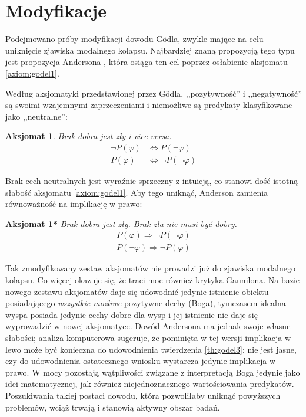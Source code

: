 \documentclass[
	runningheads
]{llncs}
\newtheorem{axiom-pl}{Aksjomat}
\begin{document}
\section{Modyfikacje} \label{sec:modyfikacje}

\setcounter{axiom-pl}{0}

Podejmowano próby modyfikacji dowodu G\"odla, zwykle mające na celu uniknięcie zjawiska modalnego kolapsu. Najbardziej znaną propozycją tego typu jest propozycja Andersona \cite{anderson1990}, która osiąga ten cel poprzez osłabienie aksjomatu \ref{axiom:godel1}. 

Według aksjomatyki przedstawionej przez G\"odla, ,,pozytywność'' i ,,negatywność'' są swoimi wzajemnymi zaprzeczeniami i niemożliwe są predykaty klasyfikowane jako ,,neutralne'':
\begin{axiom-pl}
	Brak dobra jest zły i vice versa. 
	\begin{align*}
	\neg P(\varphi) & \Leftrightarrow P(\neg \varphi) \\ 
	P(\varphi) & \Leftrightarrow \neg P( \neg \varphi )
	\end{align*}
\end{axiom-pl}
Brak cech neutralnych jest wyraźnie sprzeczny z intuicją, co stanowi dość istotną słabość aksjomatu \ref{axiom:godel1}. Aby tego uniknąć, Anderson zamienia równoważność na implikację w prawo:

\vspace*{0.2cm}
\noindent\textbf{Aksjomat 1*} \hspace*{0.1cm}
\textit{Brak dobra jest zły. Brak zła nie musi być dobry. }
\begin{align*}
	P(\varphi) \Rightarrow \neg P( \neg \varphi ) \\ 
	P( \neg \varphi ) \Rightarrow \neg P(\varphi)
\end{align*}

Tak zmodyfikowany zestaw aksjomatów nie prowadzi już do zjawiska modalnego kolapsu. Co więcej okazuje się, że traci moc również krytyka Gaunilona. Na bazie nowego zestawu aksjomatów daje się udowodnić jedynie istnienie obiektu posiadającego \emph{wszystkie możliwe} pozytywne dechy (Boga), tymczasem idealna wyspa posiada jedynie cechy dobre dla wysp i jej istnienie nie daje się wyprowadzić w nowej aksjomatyce. Dowód Andersona ma jednak swoje własne słabości; analiza komputerowa \cite{benzmuller2016} sugeruje, że pominięta w tej wersji implikacja w lewo może być konieczna do udowodnienia twierdzenia \ref{th:godel3}; nie jest jasne, czy do udowodnienia ostatecznego wniosku wystarcza jedynie implikacja w prawo. W mocy pozostają wątpliwości związane z interpretacją Boga jedynie jako idei matematycznej, jak również niejednoznacznego wartościowania predykatów. Poszukiwania takiej postaci dowodu, która pozwoliłaby uniknąć powyższych problemów, wciąż trwają i stanowią aktywny obszar badań. 
\end{document}
